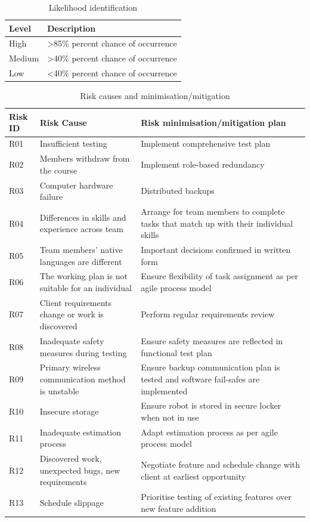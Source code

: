 \documentclass[12pt]{article}
\begin{document}
\begin{table}
\centering
\begin{tabular}{ | p{} | p{}|}
\hline
\textbf{Level} & \textbf{Description} \\
\hline
High & >85\% percent chance of occurrence\\
\hline
Medium & >40\% percent chance of occurrence\\ 
\hline
Low & <40\% percent chance of occurrence\\
\hline
\end{tabular}
\caption{Likelihood identification}
\label{table:Likelihood}
\end{table}

\begin{table}
\begin{tabular}{ | p{} | p{}| p{} |}
\hline
\textbf{Risk ID} & \textbf{Risk Cause} & \textbf{Risk minimisation/mitigation plan}\\
\hline
R01 & Insufficient testing & Implement comprehensive test plan \\
\hline
R02 & Members withdraw from the course & Implement role-based redundancy\\
\hline
R03 & Computer hardware failure & Distributed backups\\
\hline
R04 & Differences in skills and experience across team & Arrange for team members to complete tasks that match up with their individual skills \\
\hline
R05 & Team members' native languages are different & Important decisions confirmed in written form\\  
\hline
R06 & The working plan is not suitable for an individual & Ensure flexibility of task assignment as per agile process model \\
\hline
R07 & Client requirements change or work is discovered & Perform regular requirements review\\
\hline
R08 & Inadequate safety measures during testing & Ensure safety measures are reflected in functional test plan\\
\hline
R09 & Primary wireless communication method is unstable & Ensure backup communication plan is tested and software fail-safes are implemented\\
\hline
R10 & Insecure storage & Ensure robot is stored in secure locker when not in use\\
\hline
R11 & Inadequate estimation process & Adapt estimation process as per agile process model \\
\hline
R12 & Discovered work, unexpected bugs, new requirements  & Negotiate feature and schedule change with client at earliest opportunity\\
\hline
R13 & Schedule slippage & Prioritise testing of existing features over new feature addition\\
\hline
\end{tabular}
\caption{Risk causes and minimisation/mitigation}
\label{table:mitigation}
\end{table} 
\end{document}
